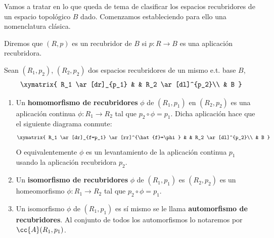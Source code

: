 Vamos a tratar en lo que queda de tema de clasificar los espacios recubridores de un espacio topológico $B$ dado. Comenzamos estableciendo para ello una nomenclatura clásica.

\begin{notacion}
    Diremos que $(R,p)$ es un recubridor de $B$ si $p:R\to B$ es una aplicación recubridora.
\end{notacion}

\begin{definicion}
    Sean $(R_1,p_2)$, $(R_2,p_2)$ dos espacios recubridores de un mismo e.t. base $B$, 
    \begin{gather*}
        \xymatrix{
            R_1 \ar[dr]_{p_1} & & R_2 \ar[dl]^{p_2}\\
            & B
        }
    \end{gather*}
    \begin{enumerate}
        \item Un \textbf{homomorfismo de recubridores} $\phi$ de $(R_1,p_1)$ en $(R_2,p_2)$ es una aplicación continua $\phi:R_1 \to R_2$  tal que $p_2 \circ \phi = p_1$. Dicha aplicación hace que el siguiente diagrama conmute:
        \begin{gather*}
            \xymatrix{
                R_1 \ar[dr]_{f=p_1} \ar[rr]^{\hat{f}=\phi} & & R_2 \ar[dl]^{p_2}\\
                & B
            }
        \end{gather*}
        O equivalentemente $\phi$ es un levantamiento de la aplicación continua $p_1$ usando la aplicación recubridora $p_2$.

        \item Un \textbf{isomorfismo de recubridores} $\phi$ de $(R_1,p_1)$ es $(R_2,p_2)$ es un homeomorfismo $\phi:R_1 \to R_2$ tal que $p_2 \circ \phi = p_1$.

        \item Un isomorfismo $\phi$ de $(R_1,p_1)$ es sí mismo se le llama \textbf{automorfismo de recubridores}. Al conjunto de todos los automorfismos lo notaremos por $\cc{A}(R_1,p_1)$.
    \end{enumerate}
\end{definicion}


